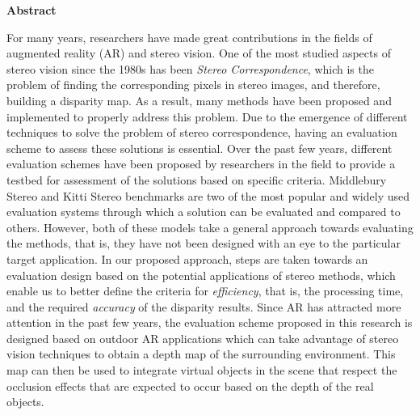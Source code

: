 \begin{center}
\textbf{\large Abstract}
\end{center}
For many years, researchers have made great contributions in the fields of augmented reality (AR) and stereo vision. 
One of the most studied aspects of stereo vision since the 1980s has been \textit{Stereo Correspondence}, which is the problem of 
finding the corresponding pixels in stereo images, and therefore, building a disparity map.
As a result, many methods have been proposed and implemented to properly address this problem. 
Due to the emergence of different techniques to solve the problem of stereo correspondence, having an evaluation scheme to assess 
these solutions is essential. Over the past few years, different evaluation schemes have been proposed 
by researchers in the field to provide a testbed for assessment of the solutions based on specific criteria.
Middlebury Stereo and Kitti Stereo benchmarks
are two of the most popular and widely used evaluation systems through which a solution can be evaluated and compared 
to others. 
However, both of these models take a general approach towards evaluating the methods, that is, they 
have not been designed with an eye to the particular target application.
In our proposed approach, steps are taken towards an evaluation design based on the potential applications of stereo methods, 
which enable us to better define the criteria for \textit{efficiency}, that is, the processing time, 
and the required \textit{accuracy} of the disparity results.
Since AR has attracted more attention in the past few years, 
the evaluation scheme proposed in this research is designed based on outdoor AR applications which can take advantage of
stereo vision techniques to obtain a depth map of the surrounding environment. This map can then be used to
integrate virtual objects in the scene that respect the occlusion effects that are expected to occur based on the depth of the real objects. 

